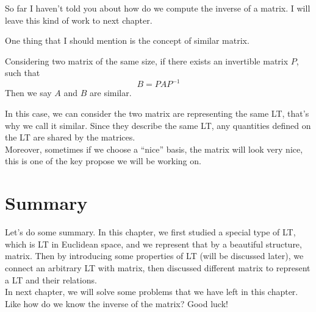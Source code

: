 So far I haven't told you about how do we compute the inverse of a matrix. I will leave this kind of work to next chapter.

One thing that I should mention is the concept of similar matrix.
\begin{definition}
    Considering two matrix of the same size, if there exists an invertible matrix $P$, such that 
    $$B = PAP^{-1}$$ Then we say $A$ and $B$ are similar.
\end{definition}
In this case, we can consider the two matrix are representing the same LT, that's why we call it similar. Since they describe the same LT, any quantities defined on the LT are shared by the matrices. \\

Moreover, sometimes if we choose a ``nice'' basis, the matrix will look very nice, this is one of the key propose we will be working on. 

\section{Summary}
Let's do some summary. In this chapter, we first studied a special type of LT, which is LT in Euclidean space, and we represent that by a beautiful structure, matrix. Then by introducing some properties of LT (will be discussed later), we connect an arbitrary LT with matrix, then discussed different matrix to represent a LT and their relations. \\

In next chapter, we will solve some problems that we have left in this chapter.  Like how do we know the inverse of the matrix? Good luck!

